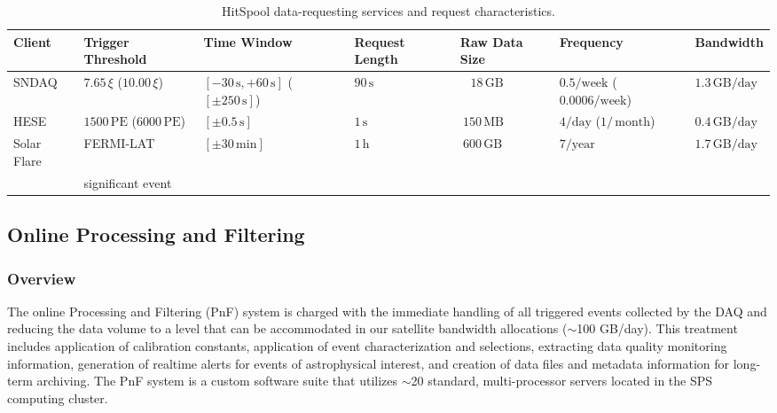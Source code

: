 \begin{table}
  \caption{HitSpool data-requesting services and request characteristics.}
  \centering
  \footnotesize
\begin{tabularx}{\textwidth}{XXXXXXX}
  \toprule Client & Trigger Threshold & Time Window & Request Length & Raw
  Data Size & Frequency & Bandwidth \\
  \midrule SNDAQ & $7.65 \,\xi$
  ($10.00 \,\xi$) & $[-30\,\mathrm{s},+60\,\mathrm{s}]$ ($[\pm250
    \,\mathrm{s}]$)& $90 \,\mathrm{s}$& ~ $18 \,\mathrm{GB}$&
  $0.5/\mathrm{week}$ ($0.0006 / \mathrm{week}$)& $1.3 \,\mathrm{GB} /
  \mathrm{day}$\\ HESE & $1500 \,\mathrm{PE} $ ($6000 \,\mathrm{PE} $) &
  $[\pm0.5\,\mathrm{s}]$& $1\,\mathrm{s}$ & $~150\,\mathrm{MB}$ &
  $4/\mathrm{day}$ ($1/\,\mathrm{month}$) & $0.4\,\mathrm{GB}/\mathrm{day}$
  \\
  Solar Flare & FERMI-LAT & $[\pm30\,\mathrm{min}]$ & $1\,\mathrm{h}$&
  $~600\,\mathrm{GB}$& $ 7 / \mathrm{year}$& $ 1.7
  \,\mathrm{GB}/\mathrm{day}$\\ & significant event & & & & &
  \\ \bottomrule
\end{tabularx}
\label{tab:hsclients}
\end{table}

\subsection{\label{sect:online:filter}Online Processing and Filtering}

\subsubsection{Overview}

The online Processing and Filtering (PnF) system is charged with the immediate
handling of all triggered events collected by the DAQ
and reducing the data volume to a level that can be accommodated in our
satellite bandwidth allocations ($\sim$100 GB/day).  This treatment
includes application of calibration constants, application of event
characterization and selections, extracting data quality monitoring
information, generation of realtime alerts for events of astrophysical
interest, and creation of data files and metadata information for long-term
archiving.  The PnF system is a custom software
suite that utilizes $\sim$20 standard, multi-processor servers located in
the SPS computing cluster.  

